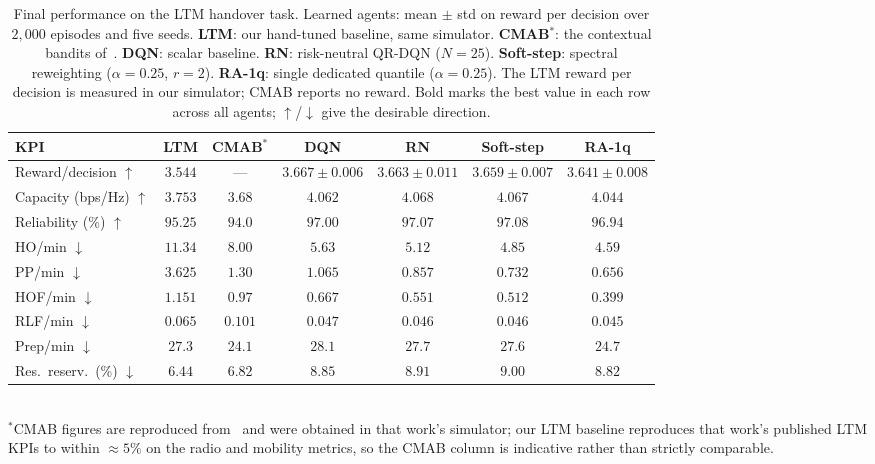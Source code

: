 \documentclass[conference]{IEEEtran}
\begin{document}
\begin{table}[t]
\caption{Final performance on the LTM handover task. Learned agents: mean $\pm$ std
on reward per decision over $2{,}000$ episodes and five seeds. \textbf{LTM}: our
hand-tuned baseline, same simulator. \textbf{CMAB}$^{*}$: the contextual bandits
of~\cite{cmab_ho}. \textbf{DQN}: scalar baseline. \textbf{RN}: risk-neutral QR-DQN
($N{=}25$). \textbf{Soft-step}: spectral reweighting ($\alpha{=}0.25$, $r{=}2$).
\textbf{RA-1q}: single dedicated quantile ($\alpha{=}0.25$). The LTM reward per
decision is measured in our simulator; CMAB reports no reward. Bold marks the best
value in each row across all agents; $\uparrow$/$\downarrow$ give the desirable
direction.}
\label{tab:final}
\centering
\setlength{\tabcolsep}{5pt}
\begin{tabular}{|l|c|c|c|c|c|c|}
\hline
\textbf{KPI} & \textbf{LTM} & \textbf{CMAB}$^{*}$ & \textbf{DQN} & \textbf{RN} & \textbf{Soft-step} & \textbf{RA-1q} \\
\hline
Reward/decision $\uparrow$          & $3.544$ & --- & $\mathbf{3.667{\pm}0.006}$ & $3.663{\pm}0.011$ & $3.659{\pm}0.007$ & $3.641{\pm}0.008$ \\
Capacity (bps/Hz) $\uparrow$        & $3.753$ & $3.68$ & $4.062$ & $\mathbf{4.068}$ & $4.067$ & $4.044$ \\
Reliability (\%) $\uparrow$         & $95.25$ & $94.0$ & $97.00$ & $97.07$ & $\mathbf{97.08}$ & $96.94$ \\
HO/min $\downarrow$                 & $11.34$ & $8.00$ & $5.63$ & $5.12$ & $4.85$ & $\mathbf{4.59}$ \\
PP/min $\downarrow$                 & $3.625$ & $1.30$ & $1.065$ & $0.857$ & $0.732$ & $\mathbf{0.656}$ \\
HOF/min $\downarrow$                & $1.151$ & $0.97$ & $0.667$ & $0.551$ & $0.512$ & $\mathbf{0.399}$ \\
RLF/min $\downarrow$                & $0.065$ & $0.101$ & $0.047$ & $0.046$ & $0.046$ & $\mathbf{0.045}$ \\
Prep/min $\downarrow$               & $27.3$ & $\mathbf{24.1}$ & $28.1$ & $27.7$ & $27.6$ & $24.7$ \\
Res.\ reserv.\ (\%) $\downarrow$    & $\mathbf{6.44}$ & $6.82$ & $8.85$ & $8.91$ & $9.00$ & $8.82$ \\
\hline
\end{tabular}
{\footnotesize\\[2pt]$^{*}$CMAB figures are reproduced from~\cite{cmab_ho} and were
obtained in that work's simulator; our LTM baseline reproduces that work's
published LTM KPIs to within ${\approx}5\%$ on the radio and mobility metrics, so
the CMAB column is indicative rather than strictly comparable.}
\end{table}
\end{document}
